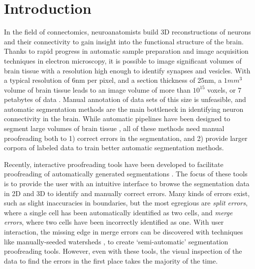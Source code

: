 \section{Introduction}

In the field of connectomics, neuroanatomists build 3D reconstructions of neurons and their connectivity to gain insight into the functional structure of the brain. Thanks to rapid progress in automatic sample preparation and image acquisition techniques in electron microscopy, it is possible to image significant volumes of brain tissue with a resolution high enough to identify synapses and vesicles. With a typical resolution of 6nm per pixel, and a section thickness of 25nm, a $1 mm^3$ volume of brain tissue leads to an image volume of more than $10^15$ voxels, or 7 petabytes of data . Manual annotation of data sets of this size is unfeasible, and automatic segmentation methods are the main bottleneck in identifying neuron connectivity in the brain. While automatic pipelines have been designed to segment large volumes of brain tissue , all of these methods need manual proofreading both to 1) correct errors in the segmentation, and 2) provide larger corpora of labeled data to train better automatic segmentation methods. 

Recently, interactive proofreading tools have been developed to facilitate proofreading of automatically generated segmentations . The focus of these tools is to provide the user with an intuitive interface to browse the segmentation data in 2D and 3D to identify and manually correct errors. Many kinds of errors exist, such as slight inaccuracies in boundaries, but the most egregious are \emph{split errors}, where a single cell has been automatically identified as two cells, and \emph{merge errors}, where two cells have been incorrectly identified as one. With user interaction, the missing edge in merge errors can be discovered with techniques like manually-seeded watersheds , to create `semi-automatic' segmentation proofreading tools.  However, even with these tools, the visual inspection of the data to find the errors in the first place takes the majority of the time.

